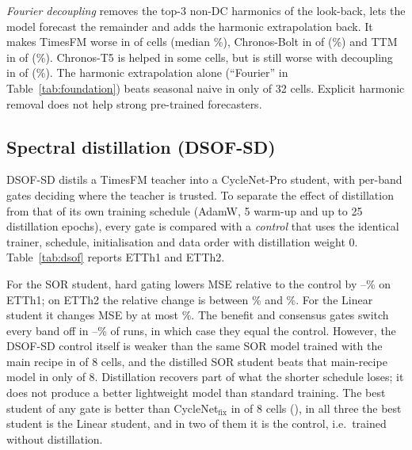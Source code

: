 \documentclass[11pt,a4paper]{article}
\begin{document}
\emph{Fourier decoupling} removes the top-3 non-DC harmonics of the look-back, lets the model forecast the remainder and adds the harmonic extrapolation back. It makes TimesFM worse in \vFourierTfmWorse{} of \vFourierTfmCells{} cells (median \vFourierTfmMedian\%), Chronos-Bolt in \vFourierBoltWorse{} of \vFourierBoltCells{} (\vFourierBoltMedian\%) and TTM in \vFourierTtmWorse{} of \vFourierTtmCells{} (\vFourierTtmMedian\%). Chronos-T5 is helped in some cells, but is still worse with decoupling in \vFourierTfiveWorse{} of \vFourierTfiveCells{} (\vFourierTfiveMedian\%). The harmonic extrapolation alone (``Fourier'' in Table~\ref{tab:foundation}) beats seasonal naive in only \vFourierBaseBeatsSnaive{} of 32 cells. Explicit harmonic removal does not help strong pre-trained forecasters.

\begin{table}[t]
\centering
\scriptsize
\setlength{\tabcolsep}{4pt}
\resizebox{\textwidth}{!}{}
\caption{\textbf{Zero-shot foundation models versus trained models on identical stride-$H$ test windows} ($n_w$ windows; MSE; trained models averaged over seeds). Bold: lowest, underlined: second-lowest per row. TTM was run at $H=96$ only. Few windows: indicative only.}
\label{tab:foundation}
\end{table}

\subsection{Spectral distillation (DSOF-SD)}
\label{sec:res-dsof}
DSOF-SD distils a TimesFM teacher into a CycleNet-Pro student, with per-band gates deciding where the teacher is trusted. To separate the effect of distillation from that of its own training schedule (AdamW, 5 warm-up and up to 25 distillation epochs), every gate is compared with a \emph{control} that uses the identical trainer, schedule, initialisation and data order with distillation weight 0. Table~\ref{tab:dsof} reports ETTh1 and ETTh2.

For the SOR student, hard gating lowers MSE relative to the control by \vDsofSorHardEOneMin--\vDsofSorHardEOneMax\% on ETTh1; on ETTh2 the relative change is between \vDsofSorHardETwoMin\% and \vDsofSorHardETwoMax\%. For the Linear student it changes MSE by at most \vDsofLinMaxAbs\%. The benefit and consensus gates switch every band off in \vDsofZeroGateMin--\vDsofZeroGateMax\% of runs, in which case they equal the control. However, the DSOF-SD control itself is weaker than the same SOR model trained with the main recipe in \vDsofSorCtrlWorseMain{} of 8 cells, and the distilled SOR student beats that main-recipe model in only \vDsofSorHardBeatsMain{} of 8. Distillation recovers part of what the shorter schedule loses; it does not produce a better lightweight model than standard training. The best student of any gate is better than CycleNet$_{\text{fix}}$ in \vDsofStudentBeatsFixed{} of 8 cells (\vDsofStudentBeatsFixedWhere), in all three the best student is the Linear student, and in two of them it is the control, i.e.\ trained without distillation.
\end{document}
